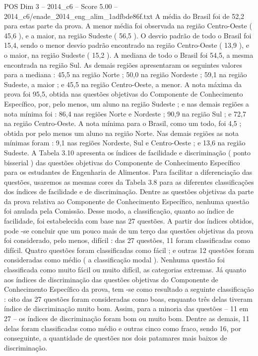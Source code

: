 \begin{textsample}{POS Dim 3 – 2014\_c6 – Score 5.00 – 2014\_c6/enade\_2014\_eng\_alim\_1adfbde86f.txt}
A média do Brasil foi de 52,2 para estas parte da prova.
A menor média foi observada na região Centro-Oeste ( 45,6 ), e a maior, na região Sudeste ( 56,5 ).
O desvio padrão de todo o Brasil foi 15,4, sendo o menor desvio padrão encontrado na região Centro-Oeste ( 13,9 ), e o maior, na região Sudeste ( 15,2 ).
A mediana de todo o Brasil foi 54,5, a mesma encontrada na região Sul.
As demais regiões apresentaram os seguintes valores para a mediana : 45,5 na região Norte ; 50,0 na região Nordeste ; 59,1 na região Sudeste, a maior ; e 45,5 na região Centro-Oeste, a menor.
A nota máxima da prova foi 95,5, obtida nas questões objetivas do Componente de Conhecimento Específico, por, pelo menos, um aluno na região Sudeste ; e nas demais regiões a nota mínima foi : 86,4 nas regiões Norte e Nordeste ; 90,9 na região Sul ; e 72,7 na região Centro-Oeste.
A nota mínima para o Brasil, como um todo, foi 4,5 ; obtida por pelo menos um aluno na região Norte.
Nas demais regiões as nota mínimas foram : 9,1 nas regiões Nordeste, Sul e Centro-Oeste ; e 13,6 na região Sudeste.
A Tabela 3.10 apresenta os índices de facilidade e discriminação ( ponto bisserial ) das questões objetivas do Componente de Conhecimento Específico para os estudantes de Engenharia de Alimentos.
Para facilitar a diferenciação das questões, usaremos as mesmas cores da Tabela 3.8 para as diferentes classificações dos índices de facilidade e de discriminação.
Dentre as questões objetivas da parte da prova relativa ao Componente de Conhecimento Específico, nenhuma questão foi anulada pela Comissão.
Desse modo, a classificação, quanto ao índice de facilidade, foi estabelecida com base nas 27 questões.
A partir dos índices obtidos, pode -se concluir que um pouco mais de um terço das questões objetivas da prova foi considerado, pelo menos, difícil : das 27 questões, 11 foram classificadas como difícil.
Quatro questões foram classificadas como fácil ; e outras 12 questões foram consideradas como médio ( a classificação modal ).
Nenhuma questão foi classificada como muito fácil ou muito difícil, as categorias extremas.
Já quanto aos índices de discriminação das questões objetivas do Componente de Conhecimento Específico da prova, tem -se como resultado a seguinte classificação : oito das 27 questões foram consideradas como boas, enquanto três delas tiveram índice de discriminação muito bom.
Assim, para a minoria das questões – 11 em 27 – os índices de discriminação foram bom ou muito bom.
Dentre as demais, 11 delas foram classificadas como médio e outras cinco como fraco, sendo 16, por conseguinte, a quantidade de questões nos dois patamares mais baixos de discriminação.

\end{textsample}
